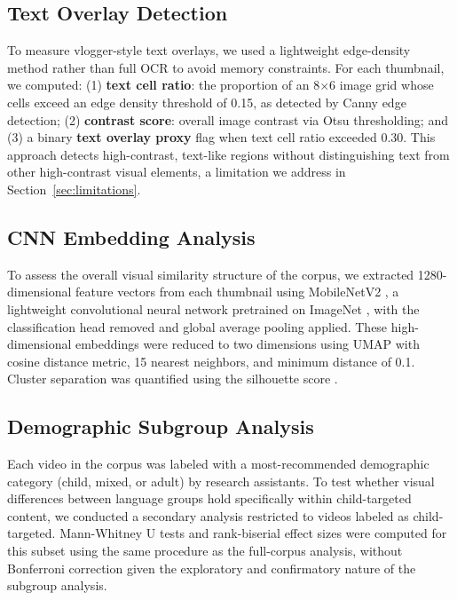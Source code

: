 \documentclass[12pt, letterpaper]{article}
\begin{document}
\subsection{Text Overlay Detection}

To measure vlogger-style text overlays, we used a lightweight edge-density method rather than full OCR to avoid memory constraints. For each thumbnail, we computed: (1) \textbf{text cell ratio}: the proportion of an 8$\times$6 image grid whose cells exceed an edge density threshold of 0.15, as detected by Canny edge detection; (2) \textbf{contrast score}: overall image contrast via Otsu thresholding; and (3) a binary \textbf{text overlay proxy} flag when text cell ratio exceeded 0.30. This approach detects high-contrast, text-like regions without distinguishing text from other high-contrast visual elements, a limitation we address in Section~\ref{sec:limitations}.

\subsection{CNN Embedding Analysis}

To assess the overall visual similarity structure of the corpus, we extracted 1280-dimensional feature vectors from each thumbnail using MobileNetV2 \citep{sandler2018}, a lightweight convolutional neural network pretrained on ImageNet \citep{deng2009}, with the classification head removed and global average pooling applied. These high-dimensional embeddings were reduced to two dimensions using UMAP \citep{mcinnes2018} with cosine distance metric, 15 nearest neighbors, and minimum distance of 0.1. Cluster separation was quantified using the silhouette score \citep{rousseeuw1987}.

\subsection{Demographic Subgroup Analysis}

Each video in the corpus was labeled with a most-recommended demographic category (child, mixed, or adult) by research assistants. To test whether visual differences between language groups hold specifically within child-targeted content, we conducted a secondary analysis restricted to videos labeled as child-targeted. Mann-Whitney U tests and rank-biserial effect sizes were computed for this subset using the same procedure as the full-corpus analysis, without Bonferroni correction given the exploratory and confirmatory nature of the subgroup analysis.
\end{document}
